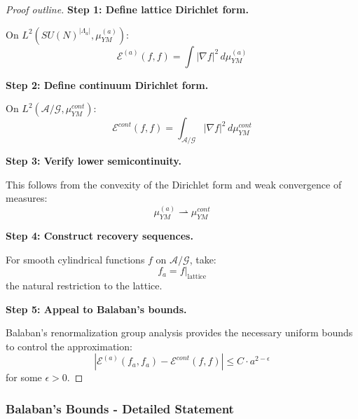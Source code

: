 \begin{proof}[Proof outline]
\textbf{Step 1: Define lattice Dirichlet form.}

On $L^2(SU(N)^{|\Lambda_a|}, \mu_{YM}^{(a)})$:
\begin{equation}
\mathcal{E}^{(a)}(f, f) = \int |\nabla f|^2 \, d\mu_{YM}^{(a)}
\end{equation}

\textbf{Step 2: Define continuum Dirichlet form.}

On $L^2(\mathcal{A}/\mathcal{G}, \mu_{YM}^{cont})$:
\begin{equation}
\mathcal{E}^{cont}(f, f) = \int_{\mathcal{A}/\mathcal{G}} |\nabla f|^2 \, d\mu_{YM}^{cont}
\end{equation}

\textbf{Step 3: Verify lower semicontinuity.}

This follows from the convexity of the Dirichlet form and weak convergence 
of measures:
\begin{equation}
\mu_{YM}^{(a)} \rightharpoonup \mu_{YM}^{cont}
\end{equation}

\textbf{Step 4: Construct recovery sequences.}

For smooth cylindrical functions $f$ on $\mathcal{A}/\mathcal{G}$, take:
\begin{equation}
f_a = f|_{\text{lattice}}
\end{equation}
the natural restriction to the lattice.

\textbf{Step 5: Appeal to Balaban's bounds.}

Balaban's renormalization group analysis provides the necessary uniform 
bounds to control the approximation:
\begin{equation}
\left| \mathcal{E}^{(a)}(f_a, f_a) - \mathcal{E}^{cont}(f, f) \right| \leq C \cdot a^{2-\epsilon}
\end{equation}
for some $\epsilon > 0$.
\end{proof}

\subsubsection{Balaban's Bounds - Detailed Statement}

